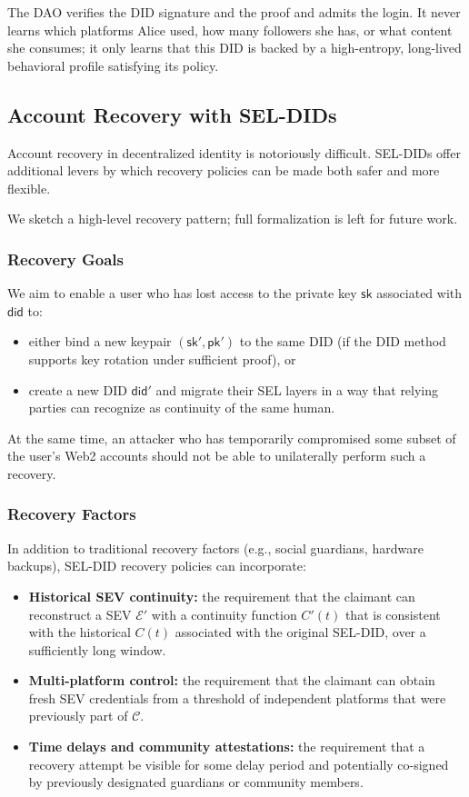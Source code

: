 \documentclass[11pt]{article}
\begin{document}
The DAO verifies the DID signature and the proof and admits the login. It never learns which platforms Alice used, how many followers she has, or what content she consumes; it only learns that this DID is backed by a high-entropy, long-lived behavioral profile satisfying its policy.

\subsection{Account Recovery with SEL-DIDs}

Account recovery in decentralized identity is notoriously difficult. SEL-DIDs offer additional levers by which recovery policies can be made both safer and more flexible.

We sketch a high-level recovery pattern; full formalization is left for future work.

\subsubsection{Recovery Goals}

We aim to enable a user who has lost access to the private key $\mathsf{sk}$ associated with $\mathsf{did}$ to:

\begin{itemize}
  \item either bind a new keypair $(\mathsf{sk}', \mathsf{pk}')$ to the same DID (if the DID method supports key rotation under sufficient proof), or
  \item create a new DID $\mathsf{did}'$ and migrate their SEL layers in a way that relying parties can recognize as continuity of the same human.
\end{itemize}

At the same time, an attacker who has temporarily compromised some subset of the user's Web2 accounts should not be able to unilaterally perform such a recovery.

\subsubsection{Recovery Factors}

In addition to traditional recovery factors (e.g., social guardians, hardware backups), SEL-DID recovery policies can incorporate:

\begin{itemize}
  \item \textbf{Historical SEV continuity:} the requirement that the claimant can reconstruct a SEV $\mathcal{E}'$ with a continuity function $C'(t)$ that is consistent with the historical $C(t)$ associated with the original SEL-DID, over a sufficiently long window.
  \item \textbf{Multi-platform control:} the requirement that the claimant can obtain fresh SEV credentials from a threshold of independent platforms that were previously part of $\mathcal{C}$.
  \item \textbf{Time delays and community attestations:} the requirement that a recovery attempt be visible for some delay period and potentially co-signed by previously designated guardians or community members.
\end{itemize}
\end{document}
